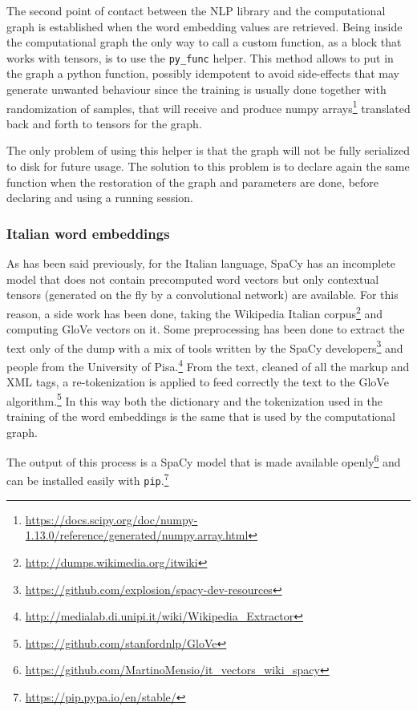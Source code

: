 The second point of contact between the NLP library and the computational graph is established when the word embedding values are retrieved. Being inside the computational graph the only way to call a custom function, as a block that works with tensors, is to use the \texttt{py\_func} helper. This method allows to put in the graph a python function, possibly idempotent to avoid side-effects that may generate unwanted behaviour since the training is usually done together with randomization of samples, that will receive and produce numpy arrays\footnote{\url{https://docs.scipy.org/doc/numpy-1.13.0/reference/generated/numpy.array.html}} translated back and forth to tensors for the graph.

The only problem of using this helper is that the graph will not be fully serialized to disk for future usage. The solution to this problem is to declare again the same function when the restoration of the graph and parameters are done, before declaring and using a running session.

\subsubsection{Italian word embeddings}
As has been said previously, for the Italian language, SpaCy has an incomplete model that does not contain precomputed word vectors but only contextual tensors (generated on the fly by a convolutional network) are available. For this reason, a side work has been done, taking the Wikipedia Italian corpus\footnote{\url{http://dumps.wikimedia.org/itwiki}} and computing GloVe vectors on it. Some preprocessing has been done to extract the text only of the dump with a mix of tools written by the SpaCy developers\footnote{\url{https://github.com/explosion/spacy-dev-resources}} and people from the University of Pisa.\footnote{\url{http://medialab.di.unipi.it/wiki/Wikipedia\_Extractor}} From the text, cleaned of all the markup and XML tags, a re-tokenization is applied to feed correctly the text to the GloVe algorithm.\footnote{\url{https://github.com/stanfordnlp/GloVe}} In this way both the dictionary and the tokenization used in the training of the word embeddings is the same that is used by the computational graph.

The output of this process is a SpaCy model that is made available openly\footnote{\url{https://github.com/MartinoMensio/it\_vectors\_wiki\_spacy}} and can be installed easily with \texttt{pip}.\footnote{\url{https://pip.pypa.io/en/stable/}}

